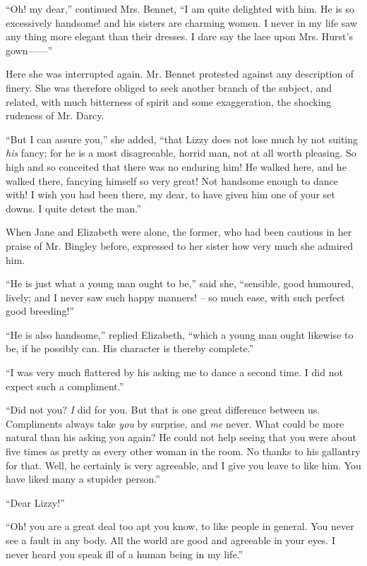 “Oh! my dear,” continued Mrs. Bennet, “I am quite
delighted with him. He is so excessively handsome! and
his sisters are charming women. I never in my life saw
any thing more elegant than their dresses. I dare say the
lace upon Mrs. Hurst’s gown------”

Here she was interrupted again. Mr. Bennet protested
against any description of finery. She was therefore
obliged to seek another branch of the subject, and related,
with much bitterness of spirit and some exaggeration, the
shocking rudeness of Mr. Darcy.

“But I can assure you,” she added, “that Lizzy does
not lose much by not suiting \textit{his} fancy; for he is a most
disagreeable, horrid man, not at all worth pleasing. So
high and so conceited that there was no enduring him!
He walked here, and he walked there, fancying himself
so very great! Not handsome enough to dance with!
I wish you had been there, my dear, to have given him
one of your set downs. I quite detest the man.”


When Jane and Elizabeth were alone, the former, who
had been cautious in her praise of Mr. Bingley before,
expressed to her sister how very much she admired him.

“He is just what a young man ought to be,” said she,
“sensible, good humoured, lively; and I never saw such
happy manners! -- so much ease, with such perfect good
breeding!”

“He is also handsome,” replied Elizabeth, “which
a young man ought likewise to be, if he possibly can.
His character is thereby complete.”

“I was very much flattered by his asking me to dance
a second time. I did not expect such a compliment.”

“Did not you? \textit{I} did for you. But that is one great
difference between us. Compliments always take \textit{you} by
surprise, and \textit{me} never. What could be more natural than
his asking you again? He could not help seeing that you
were about five times as pretty as every other woman in
the room. No thanks to his gallantry for that. Well,
he certainly is very agreeable, and I give you leave to
like him. You have liked many a stupider person.”

“Dear Lizzy!”

“Oh! you are a great deal too apt you know, to like
people in general. You never see a fault in any body.
All the world are good and agreeable in your eyes. I never
heard you speak ill of a human being in my life.”

